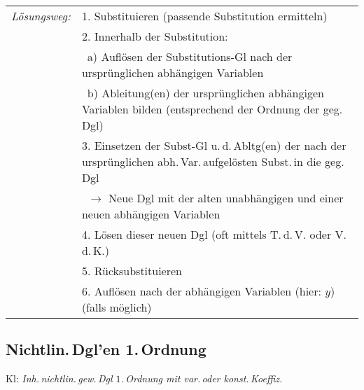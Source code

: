 \documentclass[a4paper,10pt,titlepage]{scrartcl}
\begin{document}
\begin{tabular}{ll}
 \emph{Lösungsweg:}
 & 1. Substituieren (passende Substitution ermitteln)\\
 & 2. Innerhalb der Substitution:\\
 & \quad\, a) Auflösen der Substitutions-Gl nach der ursprünglichen abhängigen Variablen\\
 & \quad\, b) Ableitung(en) der ursprünglichen abhängigen Variablen bilden (entsprechend der Ordnung der geg.\,Dgl)\\
 & 3. Einsetzen der Subst-Gl u.\,d.\,Abltg(en) der nach der ursprünglichen abh.\,Var.\,aufgelösten Subst.\,in die geg.\,Dgl\\
 & \quad\, $\to$ Neue Dgl mit der alten unabhängigen und einer neuen abhängigen Variablen\\
 & 4. Lösen dieser neuen Dgl \quad (oft mittels T.\,d.\,V. oder V.\,d.\,K.)\\
 & 5. Rücksubstituieren\\
 & 6. Auflösen nach der abhängigen Variablen (hier: $y$) (falls möglich)\\
\end{tabular}



\subsection*{Nichtlin.\,Dgl'en 1.\,Ordnung}
\label{sec:nicht-lin_dglen_1_ordnung}
Kl: \emph{Inh.\,nichtlin.\,gew.\,Dgl $1$.\,Ordnung mit var.\,oder konst.\,Koeffiz.}
\end{document}

